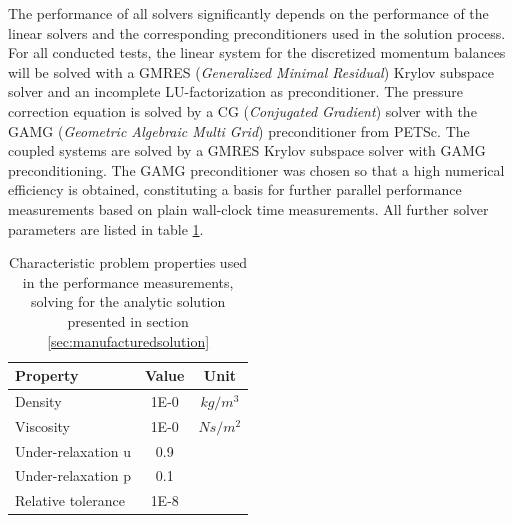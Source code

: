 The performance of all solvers significantly depends on the performance of the linear solvers and the corresponding preconditioners used in the solution process. For all conducted tests, the linear system for the discretized momentum balances will be solved with a GMRES (\emph{Generalized Minimal Residual}) \cite{saad86} Krylov subspace solver and an incomplete LU-factorization as preconditioner. The pressure correction equation is solved by a CG (\emph{Conjugated Gradient}) solver \cite{hestenes52} with the GAMG (\emph{Geometric Algebraic Multi Grid}) preconditioner from PETSc. The coupled systems are solved by a GMRES Krylov subspace solver with GAMG preconditioning. The GAMG preconditioner was chosen so that a high numerical efficiency is obtained, constituting a basis for further parallel performance measurements based on plain wall-clock time measurements. All further solver parameters are listed in table \ref{tab:performance}.

\begin{table}[h!]\centering
  \caption{Characteristic problem properties used in the performance measurements, solving for the analytic solution presented in section \ref{sec:manufacturedsolution}}
  \begin{tabular}{lcc}\toprule
    Property & Value & Unit \\
    \midrule
    \rowcolor{black!20} Density    & 1E-0 & $kg/m^3$      \\
    \rowcolor{black!00} Viscosity  & 1E-0 & $Ns/m^2$  \\
    \rowcolor{black!00} Under-relaxation u & 0.9 &  \\
    \rowcolor{black!20} Under-relaxation p & 0.1 &  \\
    \rowcolor{black!00} Relative tolerance & 1E-8&
  \end{tabular}
  \label{tab:performance}
\end{table}
 
